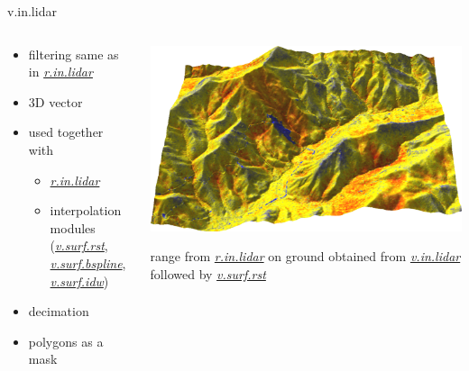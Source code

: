 \documentclass[xcolor={dvipsnames,usenames},beamer,aspectratio=169]{beamer}
\newcommand{\gmodule}[1]{\href{http://grass.osgeo.org/grass71/manuals/#1.html}{\emph{#1}}}
\begin{document}
\begin{frame}{v.in.lidar}

\begin{columns}
\begin{column}{0.28\textwidth}

\begin{itemize}
  \item filtering same as in \gmodule{r.in.lidar}
  \item 3D vector
  \item used together with
  \begin{itemize}
    \item \gmodule{r.in.lidar}
    \item interpolation modules (\gmodule{v.surf.rst}, \gmodule{v.surf.bspline}, \gmodule{v.surf.idw})
  \end{itemize}
  \item decimation
  \item polygons as a mask
\end{itemize}

\end{column}
\begin{column}{0.7\textwidth}

\begin{center}
  \includegraphics[width=\textwidth]{grass/range_on_ground_from_north}

  \footnotesize
  range from \gmodule{r.in.lidar} on ground obtained
  from \gmodule{v.in.lidar} followed by \gmodule{v.surf.rst}
\end{center}

\end{column}
\end{columns}

\end{frame}
\end{document}
